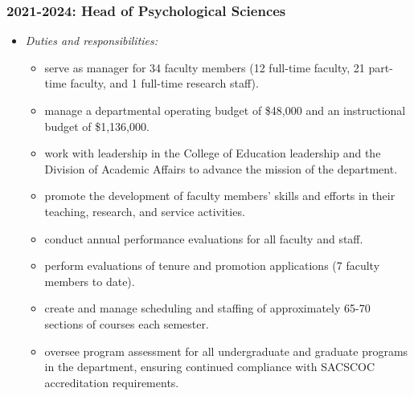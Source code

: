 \documentclass[article,10pt]{article}
\begin{document}
\subsubsection*{2021-2024: Head of Psychological Sciences}
\label{sec:org221425d}
\begin{itemize}
\item \emph{Duties and responsibilities:}
\begin{itemize}
\item serve as manager for 34 faculty members (12 full-time faculty, 21 part-time faculty, and 1 full-time research staff).
\item manage a departmental operating budget of \$48,000 and an instructional budget of \$1,136,000.
\item work with leadership in the College of Education leadership and the Division of Academic Affairs to advance the mission of the department.
\item promote the development of faculty members' skills and efforts in their teaching, research, and service activities.
\item conduct annual performance evaluations for all faculty and staff.
\item perform evaluations of tenure and promotion applications (7 faculty members to date).
\item create and manage scheduling and staffing of approximately 65-70 sections of courses each semester.
\item oversee program assessment for all undergraduate and graduate programs in the department, ensuring continued compliance with SACSCOC accreditation requirements.
\end{itemize}


\end{itemize}
\end{document}
